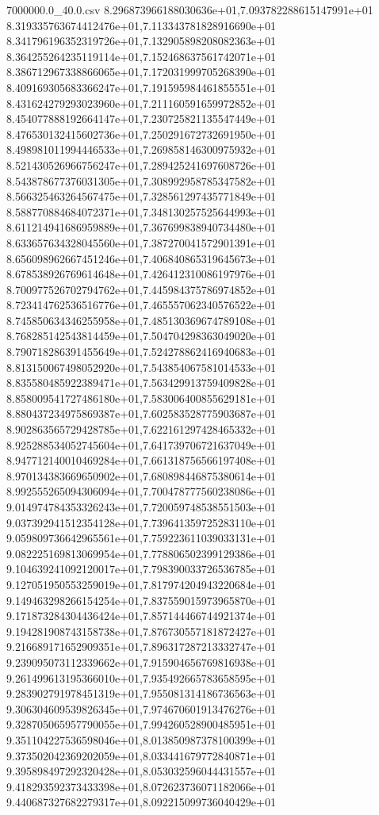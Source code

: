 \begin{filecontents*}{7000000.0_40.0.csv}
8.296873966188030636e+01,7.093782288615147991e+01
8.319335763674412476e+01,7.113343781828916690e+01
8.341796196352319726e+01,7.132905898208082363e+01
8.364255264235119114e+01,7.152468637561742071e+01
8.386712967338866065e+01,7.172031999705268390e+01
8.409169305683366247e+01,7.191595984461855551e+01
8.431624279293023960e+01,7.211160591659972852e+01
8.454077888192664147e+01,7.230725821135547449e+01
8.476530132415602736e+01,7.250291672732691950e+01
8.498981011994446533e+01,7.269858146300975932e+01
8.521430526966756247e+01,7.289425241697608726e+01
8.543878677376031305e+01,7.308992958785347582e+01
8.566325463264567475e+01,7.328561297435771849e+01
8.588770884684072371e+01,7.348130257525644993e+01
8.611214941686959889e+01,7.367699838940734480e+01
8.633657634328045560e+01,7.387270041572901391e+01
8.656098962667451246e+01,7.406840865319645673e+01
8.678538926769614648e+01,7.426412310086197976e+01
8.700977526702794762e+01,7.445984375786974852e+01
8.723414762536516776e+01,7.465557062340576522e+01
8.745850634346255958e+01,7.485130369674789108e+01
8.768285142543814459e+01,7.504704298363049020e+01
8.790718286391455649e+01,7.524278862416940683e+01
8.813150067498052920e+01,7.543854067581014533e+01
8.835580485922389471e+01,7.563429913759409828e+01
8.858009541727486180e+01,7.583006400855629181e+01
8.880437234975869387e+01,7.602583528775903687e+01
8.902863565729428785e+01,7.622161297428465332e+01
8.925288534052745604e+01,7.641739706721637049e+01
8.947712140010469284e+01,7.661318756566197408e+01
8.970134383669650902e+01,7.680898446875380614e+01
8.992555265094306094e+01,7.700478777560238086e+01
9.014974784353326243e+01,7.720059748538551503e+01
9.037392941512354128e+01,7.739641359725283110e+01
9.059809736642965561e+01,7.759223611039033131e+01
9.082225169813069954e+01,7.778806502399129386e+01
9.104639241092120017e+01,7.798390033726536785e+01
9.127051950553259019e+01,7.817974204943220684e+01
9.149463298266154254e+01,7.837559015973965870e+01
9.171873284304436424e+01,7.857144466744921374e+01
9.194281908743158738e+01,7.876730557181872427e+01
9.216689171652909351e+01,7.896317287213332747e+01
9.239095073112339662e+01,7.915904656769816938e+01
9.261499613195366010e+01,7.935492665783658595e+01
9.283902791978451319e+01,7.955081314186736563e+01
9.306304609539826345e+01,7.974670601913476276e+01
9.328705065957790055e+01,7.994260528900485951e+01
9.351104227536598046e+01,8.013850987378100399e+01
9.373502042369202059e+01,8.033441679772840871e+01
9.395898497292320428e+01,8.053032596044431557e+01
9.418293592373433398e+01,8.072623736071182066e+01
9.440687327682279317e+01,8.092215099736040429e+01

\end{filecontents*}

